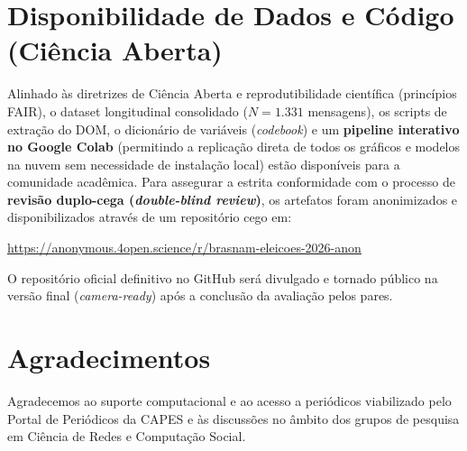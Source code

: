 \documentclass[12pt]{article}
\begin{document}
\section*{Disponibilidade de Dados e Código (Ciência Aberta)}
Alinhado às diretrizes de Ciência Aberta e reprodutibilidade científica (princípios FAIR), o dataset longitudinal consolidado ($N=1.331$ mensagens), os scripts de extração do DOM, o dicionário de variáveis (\textit{codebook}) e um \textbf{pipeline interativo no Google Colab} (permitindo a replicação direta de todos os gráficos e modelos na nuvem sem necessidade de instalação local) estão disponíveis para a comunidade acadêmica. Para assegurar a estrita conformidade com o processo de \textbf{revisão duplo-cega (\textit{double-blind review})}, os artefatos foram anonimizados e disponibilizados através de um repositório cego em:
\begin{center}
\url{https://anonymous.4open.science/r/brasnam-eleicoes-2026-anon}
\end{center}
O repositório oficial definitivo no GitHub será divulgado e tornado público na versão final (\textit{camera-ready}) após a conclusão da avaliação pelos pares.

\section*{Agradecimentos}
Agradecemos ao suporte computacional e ao acesso a periódicos viabilizado pelo Portal de Periódicos da CAPES e às discussões no âmbito dos grupos de pesquisa em Ciência de Redes e Computação Social.



\end{document}
